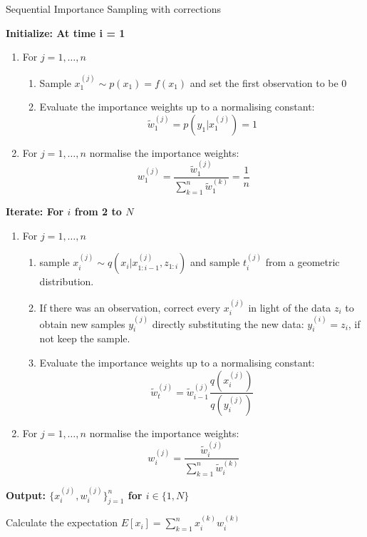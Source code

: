 \documentclass[11pt,a4paper]{article}
\begin{document}
\begin{algorithm}[H]
\caption{Sequential Importance Sampling with corrections}\label{euclid}
 \begin{algorithmic}

 \State  \bf{Initialize:} \normalfont At time i = 1
            
\begin{enumerate}
	\item For $j = 1, \dots , n$
	\begin{enumerate}
		\item Sample $x_{1}^{(j)} \sim p(x_{1}) = f(x_{1})$ and set the first observation to be 0
		\item Evaluate the importance weights up to a normalising constant:
		\[
		\tilde{w}^{(j)}_{1} = p(y_{1} | x_{1}^{(j)}) = 1
		\]
	\end{enumerate}
	\item For $j = 1, \dots , n$ normalise the importance weights: 
	\[
	w^{(j)}_{1} = \frac{\tilde{w}^{(j)}_{1}}{\sum_{k=1}^{n}\tilde{w}^{(k)}_{1}} = \frac{1}{n}
	\]
\end{enumerate}

 \State  \bf{Iterate:} \normalfont For $i$ from 2 to $N$

\begin{enumerate}
	\item For $j = 1, \dots , n$
	\begin{enumerate}
  		\item sample $x_{i}^{(j)} \sim q(x_{i} | x_{1:i - 1}^{(j)} , z_{1 : i})$ and sample $t_i^{(j)}$ from a geometric distribution.
		\item {\color{red} If there was an observation, correct every $x_{i}^{(j)}$ in light of the data $z_{i}$ to obtain new samples $y_{i}^{(j)}$ directly substituting the new data: $y_i^{(i)} = z_{i}$, if not keep the sample.}
		\item Evaluate the importance weights up to a normalising constant:
		\color{red}
		\[
		\tilde{w}^{(j)}_{t} = \tilde{w}^{(j)}_{i - 1} \frac{q(x_{i}^{(j)})}{q(y_{i}^{(j)})}
		\]
	\end{enumerate}
	\item For $j = 1, \dots , n$ normalise the importance weights:
	\[
	w^{(j)}_{i} = \frac{\tilde{w}^{(j)}_{i}}{\sum_{k=1}^{n}\tilde{w}^{(k)}_{i}}
	\]
	

\end{enumerate}

\State  \bf{Output:} \normalfont $\Big \{ x_{i}^{(j)} , w_{i}^{(j)} \Big \}_{j = 1}^{n}$ for $i \in \{ 1, N \}$

\item Calculate the expectation  $E[x_i] = \sum_{k=1}^{n} x^{(k)}_i w_{i}^{(k)}$
	

        

  
 \end{algorithmic}
\end{algorithm}
\end{document}
